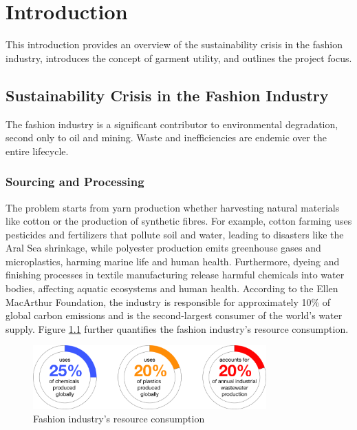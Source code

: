 \chapter{Introduction}

This introduction provides an overview of the sustainability crisis in the fashion industry, introduces the concept of garment utility, and outlines the project focus.

\section{Sustainability Crisis in the Fashion Industry}
The fashion industry is a significant contributor to environmental degradation, second only to oil and mining. Waste and inefficiencies are endemic over the entire lifecycle. 
\subsection{Sourcing and Processing}
The problem starts from yarn production whether harvesting natural materials like cotton or the production of synthetic fibres. For example, cotton farming uses pesticides and fertilizers that pollute soil and water, leading to disasters like the Aral Sea shrinkage, while polyester production emits greenhouse gases and microplastics, harming marine life and human health. Furthermore, dyeing and finishing processes in textile manufacturing release harmful chemicals into water bodies, affecting aquatic ecosystems and human health. According to the Ellen MacArthur Foundation, the industry is responsible for approximately 10\% of global carbon emissions and is the second-largest consumer of the world's water supply. Figure \ref{fig:resource_consumption} further quantifies the fashion industry's resource consumption.
\begin{figure} [H]
    \centering
    \includegraphics[width=0.8\textwidth]{Images/sourcing donuts.png}
    \caption{Fashion industry's resource consumption \cite{charter_accelerating_2024}}
    \label{fig:resource_consumption}
\end{figure}
